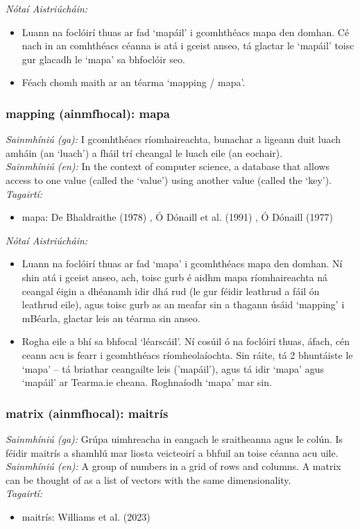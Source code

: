  \noindent \textit{Nótaí Aistriúcháin:}
\begin{itemize}
	\item Luann na foclóirí thuas ar fad `mapáil' i gcomhthéacs mapa den domhan. Cé nach in an comhthéacs céanna is atá i gceist anseo, tá glactar le `mapáil' toisc gur glacadh le `mapa' sa bhfoclóir seo.
	\item Féach chomh maith ar an téarma `mapping / mapa'.
\end{itemize}


\subsubsection*{mapping (ainmfhocal): mapa}
 \noindent \textit{Sainmhíniú (ga):} I gcomhthéacs ríomhaireachta, bunachar a ligeann duit luach amháin (an `luach') a fháil trí cheangal le luach eile (an eochair).
\\
 \noindent \textit{Sainmhíniú (en):} In the context of computer science, a database that allows access to one value (called the `value') using another value (called the `key').
\\
 \noindent \textit{Tagairtí:}
\begin{itemize}
	\item mapa: De Bhaldraithe (1978) \cite{de-bhaldraithe}, Ó Dónaill et al. (1991) \cite{focloir-beag}, Ó Dónaill (1977) \cite{odonaill}
\end{itemize}

 \noindent \textit{Nótaí Aistriúcháin:}
\begin{itemize}
	\item Luann na foclóirí thuas ar fad `mapa' i gcomhthéacs mapa den domhan. Ní shin atá i gceist anseo, ach, toisc gurb é aidhm mapa ríomhaireachta ná ceangal éigin a dhéanamh idir dhá rud (le gur féidir leathrud a fáil ón leathrud eile), agus toisc gurb as an meafar sin a thagann úsáid `mapping' i mBéarla, glactar leis an téarma sin anseo.
	\item Rogha eile a bhí sa bhfocal `léarscáil'. Ní cosúil ó na foclóirí thuas, áfach, cén ceann acu is fearr i gcomhthéacs ríomheolaíochta. Sin ráite, tá 2 bhuntáiste le `mapa' -- tá briathar ceangailte leis ('mapáil'), agus tá idir `mapa' agus `mapáil' ar Tearma.ie cheana. Roghnaíodh `mapa' mar sin.
\end{itemize}


\subsubsection*{matrix (ainmfhocal): maitrís}
 \noindent \textit{Sainmhíniú (ga):} Grúpa uimhreacha in eangach le sraitheanna agus le colún. Is féidir maitrís a shamhlú mar liosta veicteoirí a bhfuil an toise céanna acu uile.
\\
 \noindent \textit{Sainmhíniú (en):} A group of numbers in a grid of rows and columns. A matrix can be thought of as a list of vectors with the same dimensionality.
\\
 \noindent \textit{Tagairtí:}
\begin{itemize}
	\item maitrís: Williams et al. (2023) \cite{storchiste}
\end{itemize}

